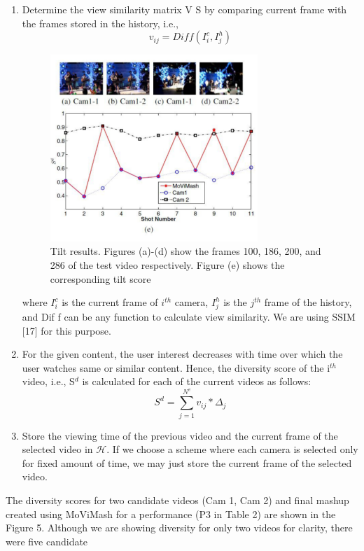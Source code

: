 \documentclass{sig-alternate-05-2015}
\begin{document}
 \begin{enumerate} 
  \item Determine the view similarity matrix V S by comparing current frame with the frames stored in the history, i.e.,
  \begin{equation}
      v_{ij} = Diff(I^c_i,I^h_j)
  \end{equation}
  \begin{figure}
\centering
\includegraphics[width=1\linewidth,height=200pt]{video_3.pdf}
\caption{Tilt results. Figures (a)-(d) show the frames 100, 186,
200, and 286 of the test video respectively. Figure (e) shows the
corresponding tilt score}
\end{figure}
  where $I^c_i$ is the current frame of $i^{th}$ camera, $I^h_j$ is the $j^{th}$
frame of the history, and Dif f can be any function to calculate view similarity. We are using SSIM [17] for this purpose.
  \item For the given content, the user interest decreases with time
over which the user watches same or similar content. Hence,
the diversity score of the i$^{th}$ video, i.e., S$^d$ is calculated for
each of the current videos as follows:
\begin{equation}
    S^d = \sum_{j=1}^{N^v}v_{ij}*\Delta_j
\end{equation}
    \item Store the viewing time of the previous video and the current
frame of the selected video in $\mathcal{H}$. If we choose a scheme
where each camera is selected only for fixed amount of time,
we may just store the current frame of the selected video.
 \end{enumerate} 
The diversity scores for two candidate videos (Cam 1, Cam 2)
and final mashup created using MoViMash for a performance (P3
in Table 2) are shown in the Figure 5. Although we are showing
diversity for only two videos for clarity, there were five candidate
\end{document}
